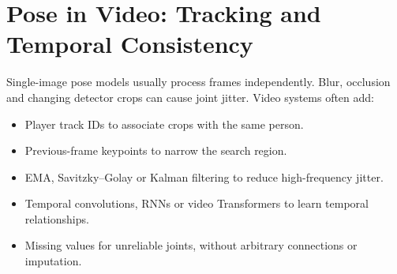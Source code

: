 \documentclass[11pt,a4paper,oneside]{report}
\begin{document}
\section{Pose in Video: Tracking and Temporal Consistency}

Single-image pose models usually process frames independently. Blur, occlusion and changing detector crops can cause joint jitter. Video systems often add:
\begin{itemize}
  \item Player track IDs to associate crops with the same person.
  \item Previous-frame keypoints to narrow the search region.
  \item EMA, Savitzky--Golay or Kalman filtering to reduce high-frequency jitter.
  \item Temporal convolutions, RNNs or video Transformers to learn temporal relationships.
  \item Missing values for unreliable joints, without arbitrary connections or imputation.
\end{itemize}
\end{document}
